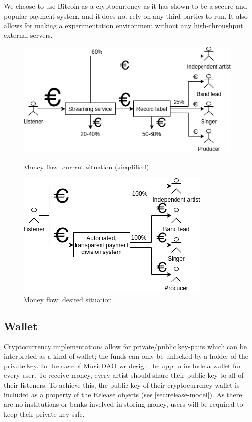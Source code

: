 We choose to use Bitcoin as a cryptocurrency as it has shown to be a secure and popular payment system, and it does not rely on any third parties to run. It also allows for making a experimentation environment without any high-throughput external servers. 

\begin{figure}
        \includegraphics[width=\linewidth]{design/current-money-flow.png}
        \caption{Money flow: current situation (simplified)}
        \label{fig:current-money-flow}
    \endminipage\hfill
        \includegraphics[width=\linewidth]{design/desired-money-flow.png}
        \caption{Money flow: desired situation}
        \label{fig:desired-money-flow}
    \endminipage
\end{figure}
\subsection{Wallet}
Cryptocurrency implementations allow for private/public key-pairs which can be interpreted as a kind of wallet; the funds can only be unlocked by a holder of the private key. In the case of MusicDAO we design the app to include a wallet for every user. To receive money, every artist should share their public key to all of their listeners. To achieve this, the public key of their cryptocurrency wallet is included as a property of the Release objects (see \ref{sec:release-model}). As there are no institutions or banks involved in storing money, users will be required to keep their private key safe.

